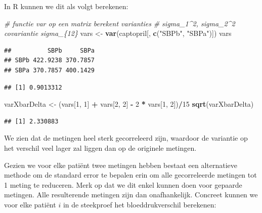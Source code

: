 \documentclass[
  12pt,dutch]{book}
\newenvironment{Shaded}{\begin{snugshade}}{\end{snugshade}}
\newcommand{\CommentTok}[1]{\textcolor[rgb]{0.56,0.35,0.01}{\textit{#1}}}
\newcommand{\DecValTok}[1]{\textcolor[rgb]{0.00,0.00,0.81}{#1}}
\newcommand{\FunctionTok}[1]{\textcolor[rgb]{0.13,0.29,0.53}{\textbf{#1}}}
\newcommand{\NormalTok}[1]{#1}
\newcommand{\OtherTok}[1]{\textcolor[rgb]{0.56,0.35,0.01}{#1}}
\newcommand{\SpecialCharTok}[1]{\textcolor[rgb]{0.81,0.36,0.00}{\textbf{#1}}}
\newcommand{\StringTok}[1]{\textcolor[rgb]{0.31,0.60,0.02}{#1}}
\theoremstyle{definition}
\theoremstyle{definition}
\theoremstyle{definition}
\theoremstyle{definition}
\theoremstyle{remark}
\begin{document}
In R kunnen we dit als volgt berekenen:

\begin{Shaded}
\begin{Highlighting}[]
\CommentTok{\# functie var op een matrix berekent varianties}
\CommentTok{\# sigma\_1\^{}2, sigma\_2\^{}2 covariantie sigma\_\{12\}}
\NormalTok{vars }\OtherTok{\textless{}{-}} \FunctionTok{var}\NormalTok{(captopril[, }\FunctionTok{c}\NormalTok{(}\StringTok{"SBPb"}\NormalTok{, }\StringTok{"SBPa"}\NormalTok{)])}
\NormalTok{vars}
\end{Highlighting}
\end{Shaded}

\begin{verbatim}
##          SBPb     SBPa
## SBPb 422.9238 370.7857
## SBPa 370.7857 400.1429
\end{verbatim}

\begin{Shaded}
\end{Shaded}

\begin{verbatim}
## [1] 0.9013312
\end{verbatim}

\begin{Shaded}
\begin{Highlighting}[]
\NormalTok{varXbarDelta }\OtherTok{\textless{}{-}}\NormalTok{ (vars[}\DecValTok{1}\NormalTok{, }\DecValTok{1}\NormalTok{] }\SpecialCharTok{+}\NormalTok{ vars[}\DecValTok{2}\NormalTok{, }\DecValTok{2}\NormalTok{] }\SpecialCharTok{{-}} \DecValTok{2} \SpecialCharTok{*}\NormalTok{ vars[}\DecValTok{1}\NormalTok{,}
    \DecValTok{2}\NormalTok{])}\SpecialCharTok{/}\DecValTok{15}
\FunctionTok{sqrt}\NormalTok{(varXbarDelta)}
\end{Highlighting}
\end{Shaded}

\begin{verbatim}
## [1] 2.330883
\end{verbatim}

We zien dat de metingen heel sterk gecorreleerd zijn, waardoor de variantie op het verschil veel lager zal liggen dan op de originele metingen.

Gezien we voor elke patiënt twee metingen hebben bestaat een alternatieve methode om de standard error te bepalen erin om alle gecorreleerde metingen tot 1 meting te reduceren. Merk op dat we dit enkel kunnen doen voor gepaarde metingen. Alle resulterende metingen zijn dan onafhankelijk.
Concreet kunnen we voor elke patiënt \(i\) in de steekproef het bloeddrukverschil berekenen:
\end{document}
